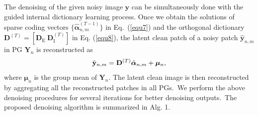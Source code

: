 \documentclass[10pt,twocolumn,letterpaper]{article}
\begin{document}
The denoising of the given noisy image $\mathbf{y}$ can be simultaneously done with the guided internal dictionary learning process. Once we obtain the solutions of sparse coding vectors $\{\hat{\bm{\alpha}}_{n,m}^{(T-1)}\}$ in Eq.\ (\ref{equ7}) and the orthogonal dictionary $\mathbf{D}^{(T)} = [\mathbf{D}_{\text{E}}\ \mathbf{D}_{\text{I}}^{(T)}]$ in Eq. (\ref{equ8}), the latent clean patch of a noisy patch $\hat{\mathbf{y}}_{n,m}$ in PG $\mathbf{Y}_{n}$ is reconstructed as
\vspace{-2mm}
\begin{equation}\label{equ10}\vspace{-2mm}
\hat{\mathbf{y}}_{n,m}=\mathbf{D}^{(T)}\hat{\bm{\alpha}}_{n,m}+\bm{\mu}_{n},
\end{equation}
where $\bm{\mu}_{n}$ is the group mean of $\mathbf{Y}_{n}$. The latent clean image is then reconstructed by aggregating all the reconstructed patches in all PGs.\ We perform the above denoising procedures for several iterations for better denoising outputs.\ The proposed denoising algorithm is summarized in Alg. 1.
\end{document}
